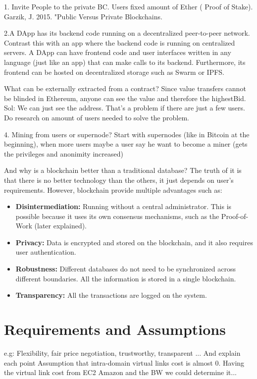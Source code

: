 1. Invite People to the private BC. Users fixed amount of Ether ( Proof of Stake). Garzik, J. 2015. "Public Versus Private Blockchains.

2.A DApp has its backend code running on a decentralized peer-to-peer network. Contrast this with an app where the backend code is running on centralized servers. A DApp can have frontend code and user interfaces written in any language (just like an app) that can make calls to its backend. Furthermore, its frontend can be hosted on decentralized storage such as Swarm or IPFS.

What can be externally extracted from a contract? Since value transfers cannot be blinded in Ethereum, anyone can see the value and therefore the highestBid. Sol: We can just see the address. That's a problem if there are just a few users. Do research on amount of users needed to solve the problem.

4. Mining from users or supernode? Start with supernodes (like in Bitcoin at the beginning), when more users maybe a user say he want to become a miner (gets the privileges and anonimity increased)

And why is a blockchain better than a traditional database? The truth of it is that there is no better technology than the others, it just depends on user's requirements. However, blockchain provide multiple advantages such as:
\begin{itemize}
	
	\item \textbf{Disintermediation:} Running without a central administrator. This is possible because it uses its own consensus mechanisms, such as the Proof-of-Work (later explained).  
	\item \textbf{Privacy:} Data is encrypted and stored on the blockchain, and it also requires user authentication.
	\item \textbf{Robustness:} Different databases do not need to be synchronized across different boundaries. All the information is stored in a single blockchain.
	\item \textbf{Transparency:} All the transactions are logged on the system.
\end{itemize}


\section{Requirements and Assumptions}

e.g: Flexibility, fair price negotiation, trustworthy, transparent ... And explain each point
Assumption that intra-domain virtual links cost is almost 0. Having the virtual link cost from EC2 Amazon and the BW we could determine it...

